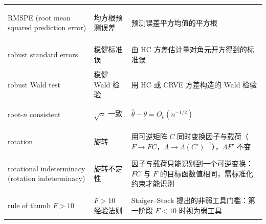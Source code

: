 \begin{longtable}{@{}>{\bfseries\boldmath\raggedright\arraybackslash}p{4.6cm}>{\raggedright\arraybackslash}p{3.2cm}>{\raggedright\arraybackslash}p{\dimexpr\textwidth-7.8cm-4\tabcolsep\relax}@{}}
RMSPE (root mean squared prediction error) & 均方根预测误差 & 预测误差平方均值的平方根 \\
robust standard errors & 稳健标准误 & 由 HC 方差估计量对角元开方得到的标准误 \\
robust Wald test & 稳健 Wald 检验 & 用 HC 或 CRVE 方差构造的 Wald 检验 \\
root-$n$ consistent & $\sqrt n$ 一致 & $\hat\theta-\theta=O_p(n^{-1/2})$ \\
rotation & 旋转 & 用可逆矩阵 $C$ 同时变换因子与载荷（$F\to FC$，$\Lambda\to\Lambda(C')^{-1}$），$\Lambda F'$ 不变 \\
rotational indeterminacy (rotation indeterminacy) & 旋转不定性 & 因子与载荷只能识别到一个可逆变换：$FC$ 与 $F$ 的目标函数值相同，需标准化约束才能识别 \\
rule of thumb $F>10$ & $F>10$ 经验法则 & Staiger--Stock 提出的非弱工具门槛：第一阶段 $F<10$ 时视为弱工具 \\
\end{longtable}

\par{}\ifdim\dimexpr\pagegoal-\pagetotal\relax<16\baselineskip\newpage\fi
